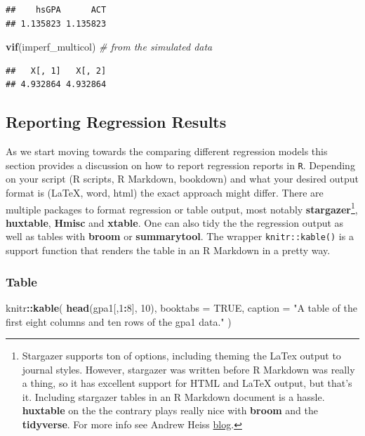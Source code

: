 \documentclass[]{book}
\newenvironment{Shaded}{\begin{snugshade}}{\end{snugshade}}
\newcommand{\CommentTok}[1]{\textcolor[rgb]{0.56,0.35,0.01}{\textit{#1}}}
\newcommand{\DataTypeTok}[1]{\textcolor[rgb]{0.13,0.29,0.53}{#1}}
\newcommand{\DecValTok}[1]{\textcolor[rgb]{0.00,0.00,0.81}{#1}}
\newcommand{\KeywordTok}[1]{\textcolor[rgb]{0.13,0.29,0.53}{\textbf{#1}}}
\newcommand{\NormalTok}[1]{#1}
\newcommand{\OperatorTok}[1]{\textcolor[rgb]{0.81,0.36,0.00}{\textbf{#1}}}
\newcommand{\OtherTok}[1]{\textcolor[rgb]{0.56,0.35,0.01}{#1}}
\newcommand{\StringTok}[1]{\textcolor[rgb]{0.31,0.60,0.02}{#1}}
\let\rmarkdownfootnote\footnote%
\def\footnote{\protect\rmarkdownfootnote}
\begin{document}
\begin{verbatim}
##    hsGPA      ACT 
## 1.135823 1.135823
\end{verbatim}

\begin{Shaded}
\begin{Highlighting}[]
\KeywordTok{vif}\NormalTok{(imperf_multicol) }\CommentTok{# from the simulated data}
\end{Highlighting}
\end{Shaded}

\begin{verbatim}
##   X[, 1]   X[, 2] 
## 4.932864 4.932864
\end{verbatim}

\hypertarget{reporting-regression-results}{%
\subsection{Reporting Regression Results}\label{reporting-regression-results}}

As we start moving towards the comparing different regression models this section provides a discussion on how to report regression reports in \texttt{R}. Depending on your script (R scripts, R Markdown, bookdown) and what your desired output format is (LaTeX, word, html) the exact approach might differ. There are multiple packages to format regression or table output, most notably \textbf{stargazer}\footnote{Stargazer supports ton of options, including theming the LaTex output to journal styles. However, stargazer was written before R Markdown was really a thing, so it has excellent support for HTML and LaTeX output, but that's it. Including stargazer tables in an R Markdown document is a hassle. \textbf{huxtable} on the the contrary plays really nice with \textbf{broom} and the \textbf{tidyverse}. For more info see Andrew Heiss \href{https://www.andrewheiss.com/blog/2018/03/08/amelia-broom-huxtable/}{blog}.}, \textbf{huxtable}, \textbf{Hmisc} and \textbf{xtable}. One can also tidy the the regression output as well as tables with \textbf{broom} or \textbf{summarytool}. The wrapper \texttt{knitr::kable()} is a support function that renders the table in an R Markdown in a pretty way.

\hypertarget{table}{%
\subsubsection{Table}\label{table}}

\begin{Shaded}
\begin{Highlighting}[]
\NormalTok{knitr}\OperatorTok{::}\KeywordTok{kable}\NormalTok{(}
  \KeywordTok{head}\NormalTok{(gpa1[,}\DecValTok{1}\OperatorTok{:}\DecValTok{8}\NormalTok{], }\DecValTok{10}\NormalTok{), }\DataTypeTok{booktabs =} \OtherTok{TRUE}\NormalTok{, }
  \DataTypeTok{caption =} \StringTok{"A table of the first eight columns and ten rows of the gpa1 data."}
\NormalTok{)}
\end{Highlighting}
\end{Shaded}
\end{document}

